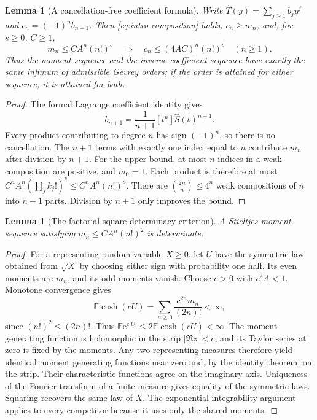 \documentclass[11pt,a4paper]{article}
\numberwithin{equation}{section}
\newtheorem{lemma}[theorem]{Lemma}
\theoremstyle{definition}
\theoremstyle{remark}
\newcommand{\ee}{\mathrm e}
\newcommand{\coef}[2]{[#1^{#2}]}
\begin{document}
\begin{lemma}[A cancellation-free coefficient formula]
\label{lem:coefficients}
Write \(\widehat T(y)=\sum_{j\ge1}b_jy^j\) and
\(c_n=(-1)^n b_{n+1}\). Then \eqref{eq:intro-composition} holds,
\(c_n\ge m_n\), and, for \(s\ge0\), \(C\ge1\),
\begin{equation}
 m_n\le CA^n(n!)^s
 \quad\Longrightarrow\quad
 c_n\le(4AC)^n(n!)^s\quad(n\ge1).
 \label{eq:gevrey-bound}
\end{equation}
Thus the moment sequence and the inverse coefficient sequence have
exactly the same infimum of admissible Gevrey orders; if the order is
attained for either sequence, it is attained for both.
\end{lemma}
\begin{proof}
The formal Lagrange coefficient identity gives
\[
 b_{n+1}=\frac1{n+1}\coef{t}{n}\widehat S(t)^{n+1}.
\]
Every product contributing to degree \(n\) has sign \((-1)^n\), so
there is no cancellation. The \(n+1\) terms with exactly one index equal
to \(n\) contribute \(m_n\) after division by \(n+1\). For the upper
bound, at most \(n\) indices in a weak composition are positive, and
\(m_0=1\). Each product is therefore at most
\(C^nA^n(\prod_jk_j!)^s\le C^nA^n(n!)^s\).
There are \(\binom{2n}{n}\le4^n\) weak compositions of \(n\) into
\(n+1\) parts. Division by \(n+1\) only improves the bound.
\end{proof}

\begin{lemma}[The factorial-square determinacy criterion]
\label{lem:hardy}
A Stieltjes moment sequence satisfying
\(m_n\le CA^n(n!)^2\) is determinate.
\end{lemma}
\begin{proof}
For a representing random variable \(X\ge0\), let \(U\) have the
symmetric law obtained from \(\sqrt X\) by choosing either sign with
probability one half. Its even moments are \(m_n\), and its odd moments
vanish. Choose \(c>0\) with \(c^2A<1\). Monotone convergence gives
\[
 \mathbb E\cosh(cU)
 =\sum_{n\ge0}\frac{c^{2n}m_n}{(2n)!}<\infty,
\]
since \((n!)^2\le(2n)!\). Thus
\(\mathbb E\ee^{c|U|}\le2\mathbb E\cosh(cU)<\infty\).
The moment generating function is holomorphic in the strip
\(|\Re z|<c\), and its Taylor series at zero is fixed by the moments.
Any two representing measures therefore yield identical moment
 generating functions near zero and, by the identity theorem, on the
strip. Their characteristic functions agree on the imaginary axis.
Uniqueness of the Fourier transform of a finite measure gives equality
of the symmetric laws. Squaring recovers the same law of \(X\).
The exponential integrability argument applies to every competitor
because it uses only the shared moments.
\end{proof}
\end{document}

